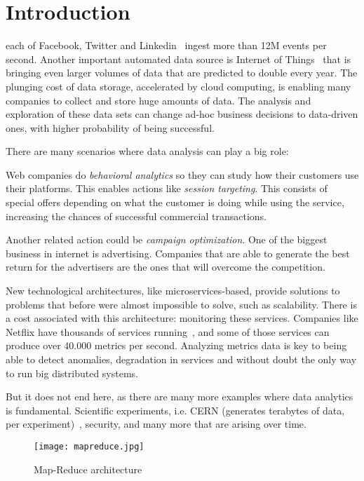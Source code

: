 \chapter{Introduction}
\label{chap:introduction}

 each of Facebook, Twitter and Linkedin~\cite{facebook, twitter, linkedin}
ingest more than 12M events per second. Another important automated data source
is Internet of Things~\cite{iot} that is bringing even larger volumes of data
that are predicted to double every year. The plunging cost of data storage,
accelerated by cloud computing, is enabling many companies to collect and store
huge amounts of data. The analysis and exploration of these data sets can change
ad-hoc business decisions to data-driven ones, with higher probability of being
successful.

\noindent
There are many scenarios where data analysis can play a big role:

Web companies do \textit{behavioral analytics} so they can study how their customers use
their platforms. This enables actions like \textit{session targeting}. This consists of
special offers depending on what the customer is doing while using the service,
increasing the chances of successful commercial transactions.

Another related action could be \textit{campaign optimization}. One of the biggest
business in internet is advertising. Companies that are able to generate the best
return for the advertisers are the ones that will overcome the competition.

New technological architectures, like microservices-based, provide solutions to
problems that before were almost impossible to solve, such as scalability. There is
a cost associated with this architecture: monitoring these services. Companies
like Netflix have thousands of services running~\cite{netflix}, and some of those
services can produce over 40.000 metrics per second. Analyzing metrics data is
key to being able to detect anomalies, degradation in services and without doubt
the only way to run big distributed systems.

But it does not end here, as there are many more examples where data analytics
is fundamental. Scientific experiments, i.e. CERN (generates terabytes of data, per
experiment)~\cite{cern}, security, and many more that are arising over time.

\begin{figure}[!h]
\begin{center}
\texttt{[image: mapreduce.jpg]}
\caption{Map-Reduce architecture~\cite{mapreduce}}
\label{fig:mapreduce}
\end{center}
\end{figure}

